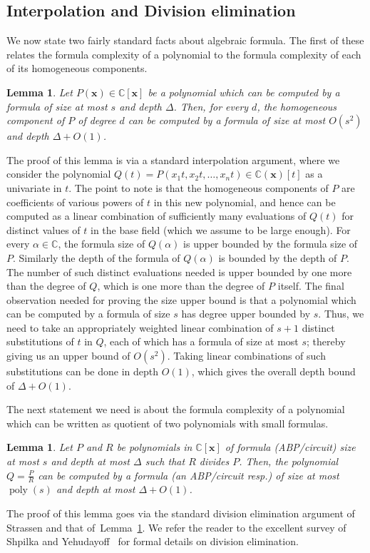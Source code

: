 \documentclass[10pt,a4paper]{article}
\newtheorem{lemma}[theorem]{Lemma}
\theoremstyle{definition}
\newcommand{\F}{\mathbb C}
\newcommand{\vx}{\mathbf x}
\DeclareMathOperator{\poly}{poly}
\begin{document}
\subsection{Interpolation and Division elimination}
We now state two fairly standard facts about algebraic formula.  The first of these relates the formula complexity of a polynomial to the formula complexity of each of its homogeneous components.  
\begin{lemma}\label{lem:homogeneous components}
Let $P(\vx) \in \F[\vx]$ be a polynomial which can be computed by a formula of size at most $s$ and depth $\Delta$. Then, for every $d$, the homogeneous component of $P$ of degree $d$ can be computed by a formula of size at most $O(s^2)$ and depth $\Delta+O(1)$.  
\end{lemma}
The proof of this lemma is via a standard interpolation argument, where we consider the polynomial $Q(t) = P(x_1t, x_2t, \ldots, x_nt) \in \F(\vx)[t]$ as a univariate in $t$. The point to note is that the homogeneous components of $P$ are coefficients of various powers of $t$ in this new polynomial, and hence can be computed as a linear combination of sufficiently many evaluations of $Q(t)$ for distinct values of $t$ in the base field (which we assume to be large enough). For every $\alpha \in \F$, the formula size of $Q(\alpha)$ is upper bounded by the formula size of $P$. Similarly the depth of the formula of $Q(\alpha)$ is bounded by the depth of $P$. The number of such distinct evaluations needed is upper bounded by one more than the degree of $Q$, which is one more than the degree of $P$ itself. The final observation needed for proving the size upper bound is that a polynomial which can be computed by a formula of size $s$ has degree upper bounded by $s$. Thus, we need to take an appropriately weighted linear combination of $s+1$ distinct substitutions of $t$ in $Q$, each of which has a formula of size at most $s$; thereby giving us an upper bound of $O(s^2)$. Taking linear combinations of such substitutions can be done in depth $O(1)$, which gives the overall depth bound of $\Delta+O(1)$. 

The next statement we need is about the formula complexity of a polynomial which can be written as quotient of two polynomials with small formulas. 
\begin{lemma}\label{lem:division of formulas}
Let $P$ and $R$ be polynomials in $\F[\vx]$ of formula (ABP/circuit) size at most $s$ and depth at most $\Delta$ such that $R$ divides $P$. Then, the polynomial $Q = \frac{P}{R}$ can be computed by a formula (an ABP/circuit resp.) of size at most $\poly(s)$ and depth at most $\Delta+O(1)$. 
\end{lemma}
The proof of this lemma goes via the standard division elimination argument of Strassen and that of~Lemma~\ref{lem:homogeneous components}. We refer the reader to the excellent survey of Shpilka and Yehudayoff~\cite{r37} for formal details on division elimination.
\end{document}
